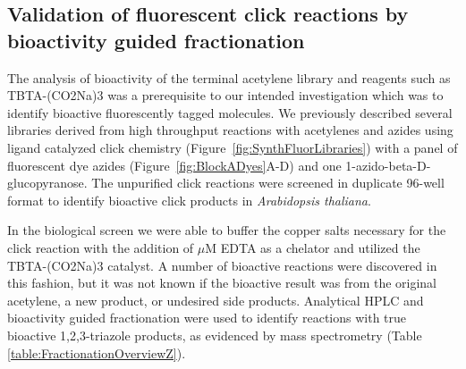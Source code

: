 
\subsection{Validation of fluorescent click reactions by bioactivity guided fractionation}

The analysis of bioactivity of the terminal acetylene library and reagents such as TBTA-(CO2Na)3 was a prerequisite to our intended investigation which was to identify bioactive fluorescently tagged molecules. We previously described several libraries derived from high throughput reactions with acetylenes and azides using ligand catalyzed click chemistry (Figure~\ref{fig:SynthFluorLibraries}) with a panel of fluorescent dye azides (Figure~\ref{fig:BlockADyes}A-D) and one 1-azido-beta-D-glucopyranose. The unpurified click reactions were screened in duplicate 96-well format to identify bioactive click products in {\it Arabidopsis thaliana}. 

In the biological screen we were able to buffer the copper salts necessary for the click reaction with the addition of $\mu$M EDTA as a chelator and utilized the TBTA-(CO2Na)3 catalyst. A number of bioactive reactions were discovered in this fashion, but it was not known if the bioactive result was from the original acetylene, a new product, or undesired side products. Analytical HPLC and bioactivity guided fractionation were used to identify reactions with true bioactive 1,2,3-triazole products, as evidenced by mass spectrometry (Table \ref{table:FractionationOverviewZ}).


\clearpage


